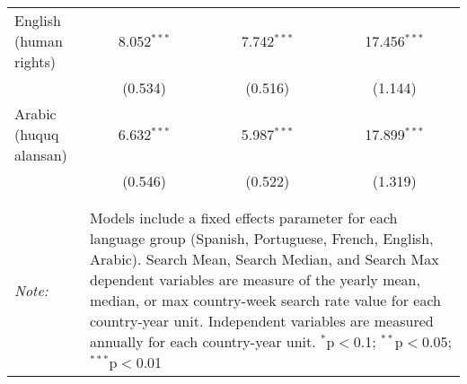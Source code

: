 \begin{table}[!htbp]
\begin{tabular}{@{\extracolsep{5pt}}lccc}
  English (human rights) & 8.052$^{***}$ & 7.742$^{***}$ & 17.456$^{***}$ \\ 
  & (0.534) & (0.516) & (1.144) \\ 
  Arabic (huquq alansan) & 6.632$^{***}$ & 5.987$^{***}$ & 17.899$^{***}$ \\ 
  & (0.546) & (0.522) & (1.319) \\ 
 \hline \\[-1.8ex] 
\hline 
\hline \\[-1.8ex] 
\textit{Note:}  & \multicolumn{3}{l}{\parbox[t]{8cm}{Models include a fixed effects parameter for each language group (Spanish, Portuguese, French, English, Arabic). Search Mean, Search Median, and Search Max dependent variables are measure of the yearly mean, median, or max country-week search rate value for each country-year unit. Independent variables are measured annually for each country-year unit. $^{*}$p$<$0.1; $^{**}$p$<$0.05; $^{***}$p$<$0.01}} \\ 
\end{tabular} 
\end{table} 
